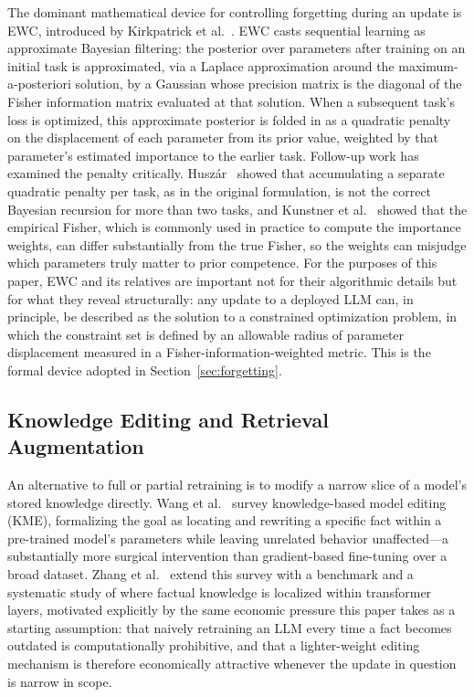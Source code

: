 \documentclass[electronics,article,submit,pdftex,moreauthors]{Definitions/mdpi}
\begin{document}
The dominant mathematical device for controlling forgetting during an update is EWC, introduced by Kirkpatrick et al.~\cite{Kirkpatrick2017}. EWC casts sequential learning as approximate Bayesian filtering: the posterior over parameters after training on an initial task is approximated, via a Laplace approximation around the maximum-a-posteriori solution, by a Gaussian whose precision matrix is the diagonal of the Fisher information matrix evaluated at that solution. When a subsequent task's loss is optimized, this approximate posterior is folded in as a quadratic penalty on the displacement of each parameter from its prior value, weighted by that parameter's estimated importance to the earlier task. Follow-up work has examined the penalty critically. Husz\'ar~\cite{Huszar2018} showed that accumulating a separate quadratic penalty per task, as in the original formulation, is not the correct Bayesian recursion for more than two tasks, and Kunstner et al.~\cite{Kunstner2019} showed that the empirical Fisher, which is commonly used in practice to compute the importance weights, can differ substantially from the true Fisher, so the weights can misjudge which parameters truly matter to prior competence. For the purposes of this paper, EWC and its relatives are important not for their algorithmic details but for what they reveal structurally: any update to a deployed LLM can, in principle, be described as the solution to a constrained optimization problem, in which the constraint set is defined by an allowable radius of parameter displacement measured in a Fisher-information-weighted metric. This is the formal device adopted in Section~\ref{sec:forgetting}.

\subsection{Knowledge Editing and Retrieval Augmentation}

An alternative to full or partial retraining is to modify a narrow slice of a model's stored knowledge directly. Wang et al.~\cite{WangS2024} survey knowledge-based model editing (KME), formalizing the goal as locating and rewriting a specific fact within a pre-trained model's parameters while leaving unrelated behavior unaffected---a substantially more surgical intervention than gradient-based fine-tuning over a broad dataset. Zhang et al.~\cite{Zhang2024} extend this survey with a benchmark and a systematic study of where factual knowledge is localized within transformer layers, motivated explicitly by the same economic pressure this paper takes as a starting assumption: that naively retraining an LLM every time a fact becomes outdated is computationally prohibitive, and that a lighter-weight editing mechanism is therefore economically attractive whenever the update in question is narrow in scope.
\end{document}
